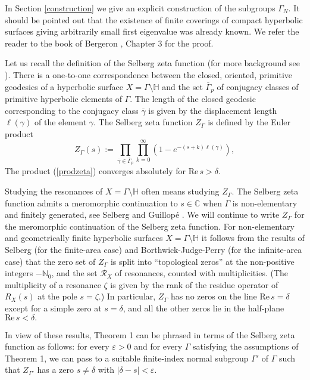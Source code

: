 \documentclass[12pt]{article}
\newcommand{\NN}{\mathbb{N}}
\newcommand{\CC}{\mathbb{C}}
\newcommand{\R}{\mathrm{Re}\,}
\newcommand{\HH}{\mathbb{H}}
\begin{document}
In Section \ref{construction} we give an explicit construction of the subgroups $ \Gamma_{N} $. It should be pointed out that the existence of finite coverings of compact hyperbolic surfaces giving arbitrarily small first eigenvalue was already known. We refer the reader to the book of Bergeron \cite{Bergeron}, Chapter 3 for the proof.


Let us recall the definition of the Selberg zeta function (for more background see \cite[Chapter~2]{Borthwick}). There is a one-to-one correspondence between the closed, oriented, primitive geodesics of a hyperbolic surface $ X = \Gamma\setminus\HH $ and the set $ \overline{\Gamma}_{p} $ of conjugacy classes of primitive hyperbolic elements of $ \Gamma $. The length of the closed geodesic corresponding to the conjugacy class $ \overline{\gamma} $ is given by the displacement length $ \ell(\gamma) $ of the element $ \gamma $.  The Selberg zeta function $ Z_{\Gamma} $ is defined by the Euler product
\begin{equation}\label{prodzeta}
Z_{\Gamma}(s) := \prod_{\overline{\gamma}\in \overline{\Gamma}_{p}} \prod_{k=0}^{\infty} \left( 1-e^{-(s+k)\ell(\gamma)}\right),
\end{equation}
The product (\ref{prodzeta}) converges absolutely for $ \R s > \delta $.

Studying the resonances of $ X = \Gamma\setminus\HH $ often means studying $ Z_{\Gamma} $. The Selberg zeta function admits a meromorphic continuation to $ s\in \CC $ when $ \Gamma $ is non-elementary and finitely generated, see Selberg \cite{Selbergzeta} and Guillopé \cite{Guil}. We will continue to write $ Z_{\Gamma} $ for the meromorphic continuation of the Selberg zeta function. For non-elementary and geometrically finite hyperbolic surfaces $ X= \Gamma\setminus \HH $ it follows from the results of Selberg \cite{Selbergzeta} (for the finite-area case) and Borthwick-Judge-Perry \cite{BJP} (for the infinite-area case) that the zero set of $ Z_{\Gamma} $ is split into ``topological zeros'' at the non-positive integers $ -\NN_{0} $, and the set $ \mathcal{R}_{X} $ of resonances, counted with multiplicities. (The multiplicity of a resonance $ \zeta $ is given by the rank of the residue operator of $ R_{X}(s) $ at the pole $ s=\zeta $.) In particular, $ Z_{\Gamma} $ has no zeros on the line $ \R s = \delta $ except for a simple zero at $ s= \delta $, and all the other zeros lie in the half-plane $ \R s < \delta. $

In view of these results, Theorem 1 can be phrased in terms of the Selberg zeta function as follows: for every $ \varepsilon > 0 $ and for every $ \Gamma $ satisfying the assumptions of Theorem 1, we can pass to a suitable finite-index normal subgroup $ \Gamma'$ of $ \Gamma $ such that $ Z_{\Gamma'} $ has a zero $ s\neq \delta $ with  $  \vert\delta -s \vert < \varepsilon $.
\end{document}

